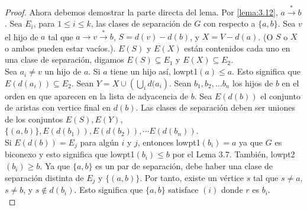 \begin{proof}
Ahora debemos demostrar la parte directa del lema. Por \ref{lema:3.12}, $a \overset{\ast}{\rightarrow} b$. Sea $E_{i}$, para $1 \leq i \leq k$, las clases de separación de $G$ con respecto a $\{a, b\}$. Sea $v$ el hijo de $a$ tal que $a \rightarrow v  \overset{\ast}{\rightarrow} b$, $S =  d\left(v\right) - d\left(b\right)$, y $X = V - d\left(a\right)$. (O $S$ o $X$ o ambos pueden estar vacíos.). $E\left(S\right)$ y $E\left(X\right)$ están contenidos cada uno en una clase de separación, digamos $E\left(S\right) \subseteq E_{1}$ y $E\left(X\right) \subseteq E_{2}$.\\

Sea $a_{i} \neq v$ un hijo de $a$. Si $a$ tiene un hijo así, lowpt1$\left(a\right) \le a$. Esto significa que $E\left(d\left(a_{i}\right)\right) \subseteq E_{2}$. Sean $Y = X \cup \left(\bigcup_{i}d(a_{i}\right)$. Sean $b_{1}, b_{2}, \ldots b_{n}$ los hijos de $b$ en el orden en que aparecen en la lista de adyacencia de $b$. Sea $E\left(d\left(b\right)\right)$ el conjunto de aristas con vertice final en $d\left(b\right)$. Las clases de separación deben ser uniones de los conjuntos $E\left(S\right), E\left(Y\right)$, $\{\left(a, b\right)\}, E\left(d\left(b_{1}\right)\right), E\left(d\left(b_{2}\right)\right), \cdots E\left(d\left(b_{n}\right)\right)$.\\

Si $E\left(d\left(b\right)\right) = E_{j}$ para algún $i$ y $j$, entonces lowpt1$\left(b_{i}\right) = a$ ya que $G$ es biconexo y esto significa que lowpt1$\left(b_{i}\right) \le b$ por el Lema 3.7. También, lowpt2$\left(b_{i}\right) \geq b$. Ya que $\{a, b\}$ es un par de separación, debe haber una clase de separación distinta de $E_{j}$ y $\{\left(a, b\right)\}$. Por tanto, existe un vértice $s$ tal que $s \neq a$, $s \neq b$, y $s \notin d\left(b_{i}\right)$. Esto significa que $\{a, b\}$ satisface $\left(i\right)$ donde $r$ es $b_{i}$.\\


\end{proof}
